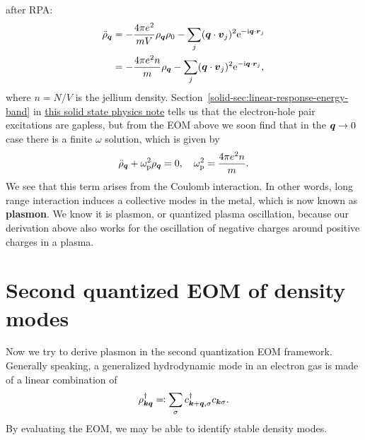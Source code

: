 \documentclass[hyperref, a4paper]{article}
\newcommand*{\ii}{\mathrm{i}}
\newcommand*{\ee}{\mathrm{e}}
\newcommand*{\concept}[1]{{\textbf{#1}}}
\newcommand{\soliddoc}{\href{../solid/solid.pdf}{this solid state physics note}}
\begin{document}
after RPA:
\begin{equation}
    \begin{aligned}
        \ddot{\rho}_{\vb*{q}} &= - \frac{4 \pi e^2}{mV} \rho_{\vb*{q}} \rho_{0} - \sum_j (\vb*{q} \cdot \vb*{v}_j)^2 \ee^{- \ii \vb*{q} \cdot \vb*{r}_j} \\
        &= - \frac{4 \pi e^2 n}{m} \rho_{\vb*{q}} - \sum_j (\vb*{q} \cdot \vb*{v}_j)^2 \ee^{- \ii \vb*{q} \cdot \vb*{r}_j} ,
    \end{aligned}
\end{equation}  
where $n = N / V$ is the jellium density. Section~\eqref{solid-sec:linear-response-energy-band} in \soliddoc{} 
tells us that the electron-hole pair excitations are gapless, but from the EOM above we soon find that in the 
$\vb*{q} \to 0$ case there is a finite $\omega$ solution, which is given by 
\begin{equation}
    \ddot{\rho}_{\vb*{q}} + \omega_\text{p}^2 \rho_{\vb*{q}} = 0, \quad \omega_\text{p}^2 = \frac{4 \pi e^2 n}{m}.
    \label{eq:uniform-oscillation}
\end{equation}
We see that this term arises from the Coulomb interaction. In other words, long range interaction induces a 
collective modes in the metal, which is now known as \concept{plasmon}. We know it is plasmon, or quantized 
plasma oscillation, because our derivation above also works for the oscillation of negative charges around 
positive charges in a plasma.

\section{Second quantized EOM of density modes}\label{sec:second-quantization}

Now we try to derive plasmon in the second quantization EOM framework. Generally speaking, a generalized 
hydrodynamic mode in an electron gas is made of a linear combination of 
\begin{equation}
    \rho_{\vb*{k} \vb*{q}}^\dagger \eqqcolon \sum_\sigma c^\dagger_{\vb*{k} + \vb*{q}, \sigma} c_{\vb*{k} \sigma}.
\end{equation}
By evaluating the EOM, we may be able to identify stable density modes.
\end{document}
